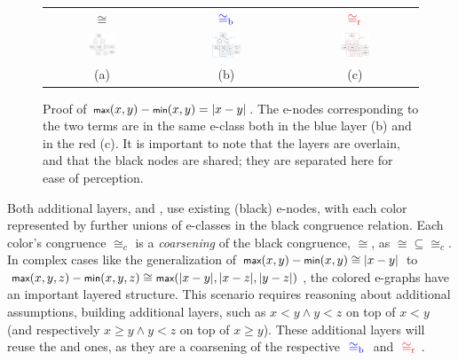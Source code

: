 \begin{figure}[t]
  \centering
  \begin{tabular}{@{}ccc@{}}
    $\cong$ & ${~\color{blue}\cong_{\mathrm{b}}\,\,}$ & ${~\color{red}\cong_{\mathrm{r}}\,\,}$ \\
    \includegraphics[width=0.25\textwidth]{colors/gfx/egraph-max-min.png} &
    \includegraphics[width=0.25\textwidth]{colors/gfx/egraph-max-min-blue.png} &
    \includegraphics[width=0.25\textwidth]{colors/gfx/egraph-max-min-red.png}
    \\
    {\small (a)} & {\small (b)} & {\small (c)}
  \end{tabular}
  \caption{Proof of $\tsmallmax(x,y)-\tsmallmin(x,y)=|x-y|$.
  The e-nodes corresponding to the two terms are in the same e-class both in the blue layer (b) and in the red (c).
   It is important to note that the layers are overlain, and that the black nodes are shared; they are separated here for ease of perception.}
  \label{overview:egraph-max-min}
\end{figure}

Both additional layers, \cblue and \cred, use existing (black) e-nodes, with each color represented by further unions of e-classes in the black congruence relation. 
Each color's congruence $\cong_c$ is a \emph{coarsening} of the black congruence, $\cong$, as ${\cong}\subseteq{\cong_c}$.
In complex cases like the generalization of $\tmax(x,y)-\tmin(x,y) \cong |x-y|$ to $\tmax(x,y,z)-\tmin(x,y,z) \cong \tmax(|x-y|, |x-z|, |y-z|)$, the colored e-graphs have an important layered structure. 
This scenario requires reasoning about additional assumptions, building additional layers, such as $x < y \land y < z$ on top of $x < y$ (and respectively $x \ge y \land y < z$ on top of $x \ge y$). 
These additional layers will reuse the \cblue and \cred ones, as they are a coarsening of the respective ${~\color{blue}\cong_{\mathrm{b}}\,\,}$ and ${~\color{red}\cong_{\mathrm{r}}\,\,}$.

